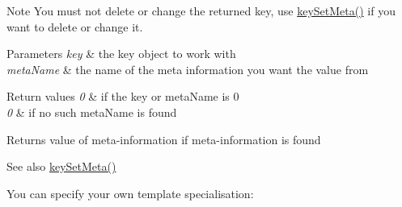 \begin{DoxyNote}{Note}
You must not delete or change the returned key, use \mbox{\hyperlink{group__keymeta_gae1f15546b234ffb6007d8a31178652b9}{key\+Set\+Meta()}} if you want to delete or change it.
\end{DoxyNote}

\begin{DoxyParams}{Parameters}
{\em key} & the key object to work with \\
\hline
{\em meta\+Name} & the name of the meta information you want the value from \\
\hline
\end{DoxyParams}

\begin{DoxyRetVals}{Return values}
{\em 0} & if the key or meta\+Name is 0 \\
\hline
{\em 0} & if no such meta\+Name is found \\
\hline
\end{DoxyRetVals}
\begin{DoxyReturn}{Returns}
value of meta-\/information if meta-\/information is found 
\end{DoxyReturn}
\begin{DoxySeeAlso}{See also}
\mbox{\hyperlink{group__keymeta_gae1f15546b234ffb6007d8a31178652b9}{key\+Set\+Meta()}}
\end{DoxySeeAlso}
You can specify your own template specialisation\+: 
\begin{DoxyCode}{0}
\DoxyCodeLine{\textcolor{keyword}{template}<>}
\DoxyCodeLine{\textcolor{keyword}{}\{}
\DoxyCodeLine{                                )}
\DoxyCodeLine{                        )}
\DoxyCodeLine{                );}
\DoxyCodeLine{\}}
\end{DoxyCode}



